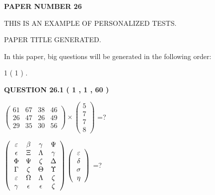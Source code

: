 \documentclass[12pt]{article}
\begin{document}
 
 
   
   
\newpage 
\setcounter{page}{ 
    26001 } 
   
   
   
   
 {\textbf{ \Large{ PAPER NUMBER  26  }}}
   
   
\vspace{0.2in}
   
   
   
   
   
   
   
   
 \vspace{0.2in}
{\Huge  THIS IS AN EXAMPLE OF}
{\Huge  PERSONALIZED TESTS. }
   
   
 PAPER TITLE GENERATED.
   
   
   
\vspace{0.2in}
   
In this paper, big questions will be generated in the following order: 
   
   
   1 ( 1 )
 .
  
\vspace{0.2in}
  
{\textbf{\Large{QUESTION
26.1 
 ( 1 , 1 , 60 )
}}}
  
  
 
$ \left( \begin{array}{ccccccccc}
 61  & 
 67  & 
 38  & 
 46  \\ 
 26  & 
 47  & 
 26  & 
 49  \\ 
 29  & 
 35  & 
 30  & 
 56
\end{array}\right) \times
\left( \begin{array}{c}
 5  \\ 
 7  \\ 
 7  \\ 
 8
\end{array}\right) $ =?
 
 
$  %
 \left( \begin{array}
 {
 c
 c
 c
 c
 }
 \varepsilon & 
 \beta & 
 \gamma & 
 \Psi \\ 
 \epsilon & 
                    \Xi & 
 \Lambda & 
 \gamma \\ 
 \Phi & 
 \Psi & 
                    \zeta & 
 \Delta \\ 
 \Gamma & 
                    \zeta & 
 \Theta & 
 \Upsilon \\ 
 \varepsilon & 
 \Omega & 
 \Lambda & 
                    \zeta \\ 
 \gamma & 
 \epsilon & 
 \epsilon & 
                    \zeta
 \end{array} \right)
 \left( \begin{array}
 {
 c
 }
 \varepsilon \\ 
 \delta \\ 
 \sigma \\ 
 \eta
 \end{array} \right)
$ =?
 
\end{document}
